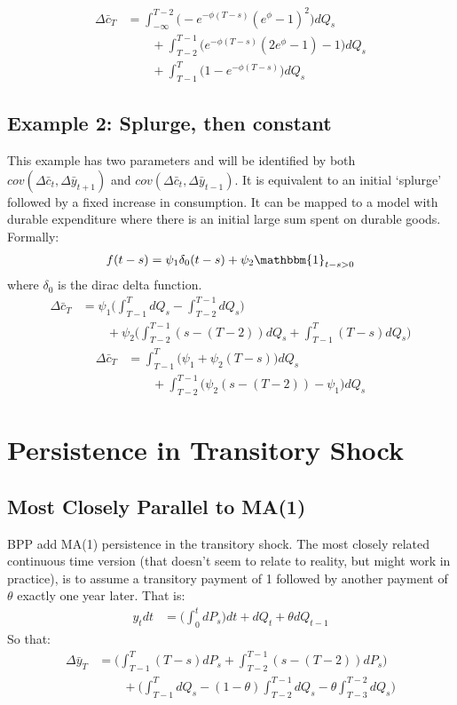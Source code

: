 \documentclass[12pt,pdftex,letterpaper]{article}
\begin{document}
\begin{align*}
\Delta \bar{c}_T &=   \int_{-\infty}^{T-2} \Big(-e^{-\phi (T-s)}(e^{\phi}-1)^2  \Big) dQ_s \\
& \qquad +  \int_{T-2}^{T-1} \Big(e^{-\phi (T-s)}(2e^{\phi}-1) - 1 \Big) dQ_s \\
& \qquad + \int_{T-1}^{T} \Big( 1-e^{-\phi (T-s)} \Big) dQ_s
\end{align*}

\subsection{Example 2: Splurge, then constant}
This example has two parameters and will be identified by both $cov(\Delta \bar{c}_t,\Delta \bar{y}_{t+1})$ and $cov(\Delta \bar{c}_t,\Delta \bar{y}_{t-1})$. It is equivalent to an initial `splurge' followed by a fixed increase in consumption. It can be mapped to a model with durable expenditure where there is an initial large sum spent on durable goods. Formally:
\begin{align*}
f(t-s) = \psi_1 \delta_0(t-s) + \psi_2 \mathbbm{1}_{t-s>0}
\end{align*}
where $\delta_0$ is the dirac delta function.
\begin{align*}
\Delta \bar{c}_T &=  \psi_1 \Big( \int_{T-1}^{T} dQ_s- \int_{T-2}^{T-1}dQ_s \Big) \\
& \qquad + \psi_2 \Big(\int_{T-2}^{T-1} (s-(T-2))dQ_s  + \int_{T-1}^{T} (T-s)dQ_s \Big)
\end{align*}
\begin{align}
\Delta \bar{c}_T &=   \int_{T-1}^{T} \big( \psi_1 +\psi_2 (T-s)\big) dQ_s \nonumber \\
& \qquad + \int_{T-2}^{T-1} \big(\psi_2  (s-(T-2)) -\psi_1 \big) dQ_s \label{splurge_c}
\end{align}

\section{Persistence in Transitory Shock}
\subsection{Most Closely Parallel to MA(1)}
BPP add MA(1) persistence in the transitory shock. The most closely related continuous time version (that doesn't seem to relate to reality, but might work in practice), is to assume a transitory payment of 1 followed by another payment of $\theta$ exactly one year later. That is:
\begin{align*}
y_t dt &= \Big(\int_{0}^{t} dP_s \Big) dt + dQ_t + \theta dQ_{t-1}
\end{align*}
So that:
\begin{align}
\Delta \bar{y}_T  &= \Big(\int_{T-1}^{T} (T-s) dP_s + \int_{T-2}^{T-1} (s-(T-2)) dP_s\Big)  \nonumber \\
& \qquad + \Big(\int_{T-1}^{T} dQ_s - (1-\theta)\int_{T-2}^{T-1}  dQ_s - \theta\int_{T-3}^{T-2}  dQ_s \Big) \label{MA1_y}
\end{align}
\end{document}
